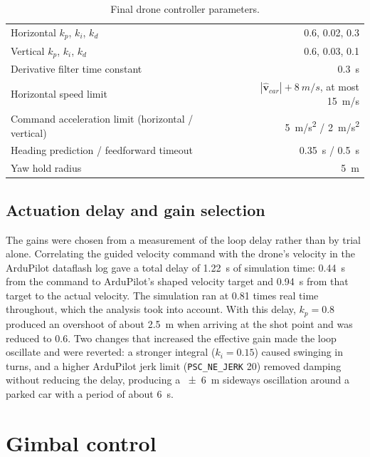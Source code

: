 \documentclass[11pt,a4paper]{report}
\begin{document}
\begin{table}[htbp]
  \centering
  \caption{Final drone controller parameters.}
  \label{tab:pid}
  \begin{tabular}{@{}lr@{}}
    \toprule
    Horizontal $k_p$, $k_i$, $k_d$ & 0.6, 0.02, 0.3 \\
    Vertical $k_p$, $k_i$, $k_d$ & 0.6, 0.03, 0.1 \\
    Derivative filter time constant & \SI{0.3}{s} \\
    Horizontal speed limit & $|\hat{\mathbf{v}}_{car}|+\SI{8}{m/s}$, at most \SI{15}{m/s} \\
    Command acceleration limit (horizontal / vertical) & \SI{5}{m/s^2} / \SI{2}{m/s^2} \\
    Heading prediction / feedforward timeout & \SI{0.35}{s} / \SI{0.5}{s} \\
    Yaw hold radius & \SI{5}{m} \\
    \bottomrule
  \end{tabular}
\end{table}

\subsection{Actuation delay and gain selection}
The gains were chosen from a measurement of the loop delay rather than by trial
alone. Correlating the guided velocity command with the drone's velocity in the
ArduPilot dataflash log gave a total delay of \SI{1.22}{s} of simulation time:
\SI{0.44}{s} from the command to ArduPilot's shaped velocity target and
\SI{0.94}{s} from that target to the actual velocity. The simulation ran at
0.81 times real time throughout, which the analysis took into account. With this
delay, $k_p=0.8$ produced an overshoot of about \SI{2.5}{m} when arriving at the
shot point and was reduced to 0.6. Two changes that increased the effective gain
made the loop oscillate and were reverted: a stronger integral ($k_i=0.15$) caused
swinging in turns, and a higher ArduPilot jerk limit (\texttt{PSC\_NE\_JERK} 20)
removed damping without reducing the delay, producing a \SI{\pm 6}{m} sideways
oscillation around a parked car with a period of about \SI{6}{s}.

\section{Gimbal control}
\label{sec:gimbal}
\end{document}
